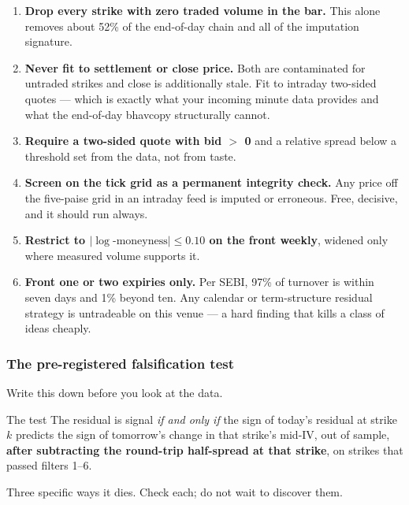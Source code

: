 \documentclass[11pt,a4paper]{article}
\begin{document}
\begin{enumerate}
\item \textbf{Drop every strike with zero traded volume in the bar.} This alone
removes about 52\% of the end-of-day chain and all of the imputation signature.
\item \textbf{Never fit to settlement or close price.} Both are contaminated for
untraded strikes and close is additionally stale. Fit to intraday two-sided
quotes --- which is exactly what your incoming minute data provides and what the
end-of-day bhavcopy structurally cannot.
\item \textbf{Require a two-sided quote with bid $>$ 0} and a relative spread
below a threshold set from the data, not from taste.
\item \textbf{Screen on the tick grid as a permanent integrity check.} Any price
off the five-paise grid in an intraday feed is imputed or erroneous. Free,
decisive, and it should run always.
\item \textbf{Restrict to $|\log\text{-moneyness}| \le 0.10$ on the front weekly},
widened only where measured volume supports it.
\item \textbf{Front one or two expiries only.} Per SEBI, 97\% of turnover is
within seven days and 1\% beyond ten. Any calendar or term-structure residual
strategy is untradeable on this venue --- a hard finding that kills a class of
ideas cheaply.
\end{enumerate}

\subsubsection{The pre-registered falsification test}

Write this down before you look at the data.

\begin{keyfact}{The test}
The residual is signal \emph{if and only if} the sign of today's residual at
strike $k$ predicts the sign of tomorrow's change in that strike's mid-IV, out of
sample, \textbf{after subtracting the round-trip half-spread at that strike}, on
strikes that passed filters 1--6.
\end{keyfact}

Three specific ways it dies. Check each; do not wait to discover them.
\end{document}
